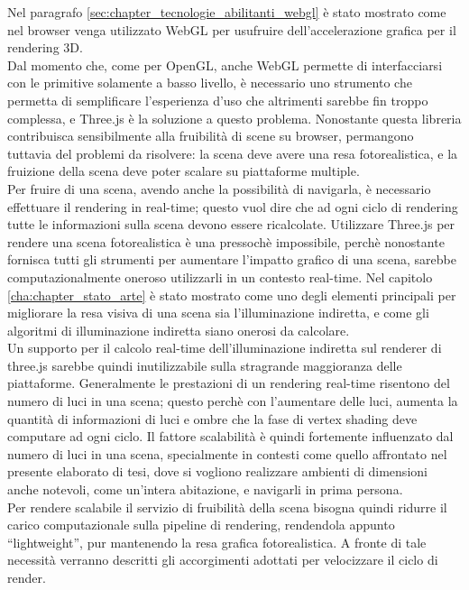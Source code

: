 Nel paragrafo \ref{sec:chapter_tecnologie_abilitanti_webgl} è stato mostrato come nel browser venga utilizzato WebGL per usufruire dell’accelerazione grafica per il rendering 3D.
\\ 
Dal momento che, come per OpenGL, anche WebGL permette di interfacciarsi con le primitive solamente a basso livello, è necessario uno strumento che permetta di semplificare l’esperienza d’uso che altrimenti sarebbe fin troppo complessa, e Three.js è la soluzione a questo problema. Nonostante questa libreria contribuisca sensibilmente alla fruibilità di scene su browser, permangono tuttavia del problemi da risolvere: la scena deve avere una resa fotorealistica, e la fruizione della scena deve poter scalare su piattaforme multiple.
\\
Per fruire di una scena, avendo anche la possibilità di navigarla, è necessario effettuare il rendering in real-time; questo vuol dire che ad ogni ciclo di rendering tutte le informazioni sulla scena devono essere ricalcolate.
Utilizzare Three.js per rendere una scena fotorealistica è una pressochè impossibile, perchè nonostante fornisca tutti gli strumenti per aumentare l’impatto grafico di una scena, sarebbe computazionalmente oneroso utilizzarli in un contesto real-time.
Nel capitolo \ref{cha:chapter_stato_arte} è stato mostrato come uno degli elementi principali per migliorare la resa visiva di una scena sia l’illuminazione indiretta, e come gli algoritmi di illuminazione indiretta siano onerosi da calcolare.
\\
Un supporto per il calcolo real-time dell’illuminazione indiretta sul renderer di three.js sarebbe quindi inutilizzabile sulla stragrande maggioranza delle piattaforme. Generalmente le prestazioni di un rendering real-time risentono del numero di luci in una scena; questo perchè con l’aumentare delle luci, aumenta la quantità di informazioni di luci e ombre che la fase di vertex shading deve computare ad ogni ciclo.
Il fattore scalabilità è quindi fortemente influenzato dal numero di luci in una scena, specialmente in contesti come quello affrontato nel presente elaborato di tesi, dove si vogliono realizzare ambienti di dimensioni anche notevoli, come un’intera abitazione, e navigarli in prima persona.
\\
Per rendere scalabile il servizio di fruibilità della scena bisogna quindi ridurre il carico computazionale sulla pipeline di rendering, rendendola appunto “lightweight”, pur mantenendo la resa grafica fotorealistica.
A fronte di tale necessità verranno descritti gli accorgimenti adottati per velocizzare il ciclo di render.
